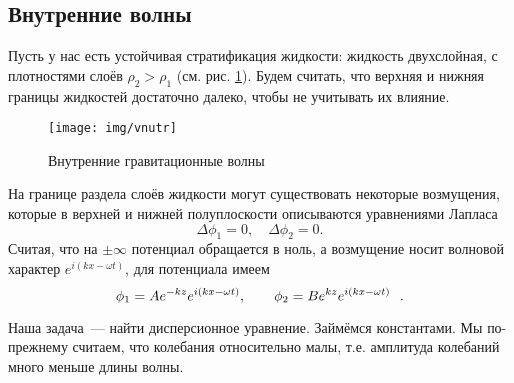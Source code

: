\newpage
\subsection{Внутренние волны}





Пусть у нас есть устойчивая стратификация жидкости: жидкость двухслойная, с плотностями слоёв $\rho_2>\rho_1$ (см. рис. \ref{fig:vnutr}). Будем считать, что верхняя и нижняя границы жидкостей достаточно далеко, чтобы не учитывать их влияние.
\begin{figure}[H]
    \centering
    \texttt{[image: img/vnutr]}
    \caption{Внутренние гравитационные волны}
    \label{fig:vnutr}
\end{figure}
На границе раздела слоёв жидкости могут существовать некоторые возмущения, которые в верхней и нижней полуплоскости описываются уравнениями Лапласа
\begin{equation}
    \Delta\phi_1 = 0, \quad \Delta\phi_2 = 0.
\end{equation}
Считая, что на $\pm\infty$ потенциал обращается в ноль, а возмущение носит волновой характер $e^{i(kx-\omega t)}$,  для потенциала имеем
\begin{equation}
    \phi_1 = A e^{-kz} e^{i(kx-\omega t)},\qquad
    \phi_2 = B e^{kz} e^{i(kx-\omega t)}\hphantom{^{-}}.
\end{equation}

Наша задача~--- найти дисперсионное уравнение.
Займёмся константами.
Мы по-прежнему считаем, что колебания относительно малы, т.е. амплитуда колебаний много меньше длины волны.

